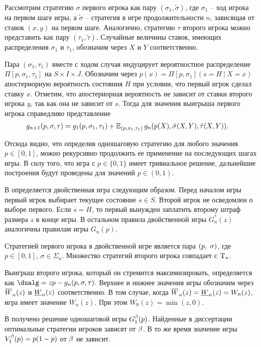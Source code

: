 Рассмотрим стратегию $\sigma$ первого игрока как пару $(\sigma_1, \tilde{\sigma})$, где $\sigma_1$ -- ход игрока на первом шаге игры, а $\tilde{\sigma}$ -- стратегия в игре продолжительности $n$, зависящая от ставок $(x, y)$ на первом шаге.
Аналогично, стратегию $\tau$ второго игрока можно представить как пару $(\tau_1, \tilde{\tau})$.
Случайные величины ставок, имеющих распределения $\sigma_1$ и $\tau_1$, обозначим через $X$ и $Y$ соответственно.

Пара $(\sigma_1, \tau_1)$ вместе с ходом случая индуцирует вероятностное распределение $\Pi[p, \sigma_1, \tau_1]$ на $S \times I \times J$.
Обозначим через
$
  p(x) = \Pi[p, \sigma_1](s = H\ |\ X = x)
$
апостериорную вероятность состояния $H$ при условии, что первый игрок сделал ставку $x$.
Отметим, что апостериорная вероятность не зависит от ставки второго игрока $y$, так как она не зависит от $s$.
Тогда для значения выигрыша первого игрока справедливо представление
\begin{align*}
  g_{n+1}(p, \sigma, \tau) 
  &= 
    g_1(p, \sigma_1, \tau_1) +
    \operatorname{\mathbb{E}}_{( p, \sigma_1, \tau_1 )}
    g_n(p(X), \tilde{\sigma}(X, Y), \tilde{\tau}(X, Y)).
\end{align*}

Отсюда видно, что определив одношаговую стратегию для любого значения $p \in [0, 1]$, можно рекурсивно продолжить ее применение на последующих шагах игры.
В силу того, что игра с $p \in \{0, 1\}$ имеет тривиальное решение, дальнейшие построения будут проведены для значений $p \in (0, 1)$.

В  определяется двойственная игра следующим образом.
Перед началом игры первый игрок выбирает текущее состояние $s \in S$.
Второй игрок не осведомлен о выборе первого.
Если $s = H$, то первый вынужден заплатить второму штраф размера $z$ в конце игры.
В остальном правила двойственной игры $G^*_n(z)$ аналогичны правилам игры $G_n(p)$.

Стратегией первого игрока в двойственной игре является пара $(p,\ \sigma)$, где $p \in [0, 1]$, $\sigma \in \Sigma_n$.
Множество стратегий второго игрока совпадает с $\mathrm{T}_n$.

Выигрыш второго игрока, который он стремится максимизировать, определяется как
$
  \dualg = z p - g_n(p, \sigma, \tau).
$
Верхнее и нижнее значения игры обозначим через $\HW{n}(z)$ и $\LW{n}(z)$ соответственно.
В том случае, когда $\HW{n}(z) = \LW{n}(z) = W_n(z)$, игра имеет значение $W_n(z)$.
При этом $W_0(z) = \min(z, 0)$.

В  получено решение одношаговой игры $G^{\beta}_1(p)$.
Найденные в диссертации оптимальные стратегии игроков зависят от $\beta$.
В то же время значение игры $V^{\beta}_1(p) = p(1-p)$ от $\beta$ не зависит.

